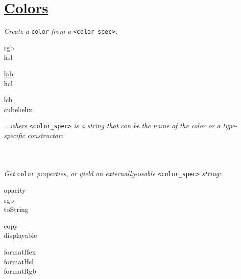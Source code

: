 \section{\href{https://github.com/d3/d3-color/}{Colors}}

\textit{Create a }\texttt{color}\textit{ from a }\texttt{<color\_spec>}\textit{:}

{\footnotesize
\begin{minipage}[t]{2.0cm}
    rgb\\
    hsl
\end{minipage}
\begin{minipage}[t]{2.0cm}
    \href{https://en.wikipedia.org/wiki/Lab\_color\_space\#CIELAB}{lab}\\
    hcl
\end{minipage}
\begin{minipage}[t]{2.0cm}
    \href{https://en.wikipedia.org/wiki/CIELAB\_color\_space\#Cylindrical\_representation:\_CIELCh\_or\_CIEHLC}{lch}\\
    cubehelix
\end{minipage}
}


\textit{...where }\texttt{<color\_spec>}\textit{ is a string that can be the name of the color or a type-specific constructor:}\\
\\
\\
\\




\textit{Get }\texttt{color}\textit{ properties, or yield an externally-usable }\texttt{<color\_spec>}\textit{ string:}

{\footnotesize
\begin{minipage}[t]{2.0cm}
    opacity\\
    rgb\\
    toString
\end{minipage}
\begin{minipage}[t]{2.0cm}
    copy\\
    displayable
\end{minipage}
\begin{minipage}[t]{2.0cm}
    formatHex\\
    formatHsl\\
    formatRgb
\end{minipage}
}

